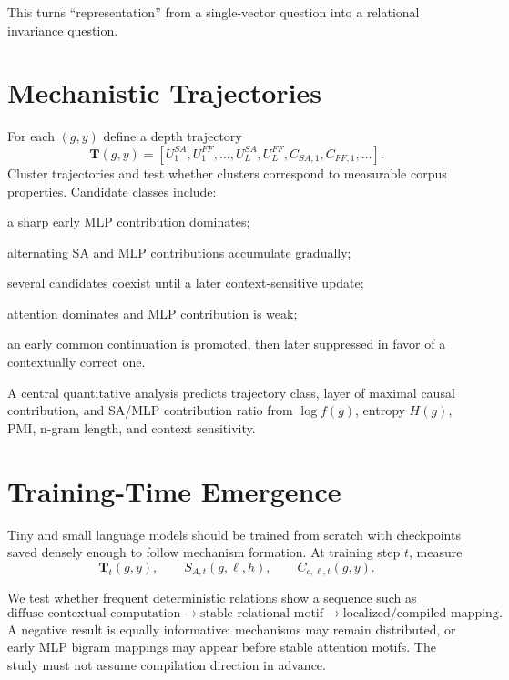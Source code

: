 \documentclass[10pt]{article}
\begin{document}
This turns ``representation'' from a single-vector question into a relational invariance question.

\section{Mechanistic Trajectories}
For each $(g,y)$ define a depth trajectory
\begin{equation}
 \mathbf T(g,y)=\left[U^{SA}_1,U^{FF}_1,\ldots,U^{SA}_L,U^{FF}_L, C_{SA,1},C_{FF,1},\ldots\right].
\end{equation}
Cluster trajectories and test whether clusters correspond to measurable corpus properties. Candidate classes include:
\begin{description}[style=nextline]
    \item[Early lookup:] a sharp early MLP contribution dominates;
    \item[Progressive composition:] alternating SA and MLP contributions accumulate gradually;
    \item[Late disambiguation:] several candidates coexist until a later context-sensitive update;
    \item[Retrieval/copy:] attention dominates and MLP contribution is weak;
    \item[Override/repair:] an early common continuation is promoted, then later suppressed in favor of a contextually correct one.
\end{description}

A central quantitative analysis predicts trajectory class, layer of maximal causal contribution, and SA/MLP contribution ratio from $\log f(g)$, entropy $H(g)$, PMI, n-gram length, and context sensitivity.

\section{Training-Time Emergence}
Tiny and small language models should be trained from scratch with checkpoints saved densely enough to follow mechanism formation. At training step $t$, measure
\begin{equation}
 \mathbf T_t(g,y),\qquad S_{A,t}(g,\ell,h),\qquad C_{c,\ell,t}(g,y).
\end{equation}

We test whether frequent deterministic relations show a sequence such as
\begin{equation}
 \text{diffuse contextual computation}\rightarrow
 \text{stable relational motif}\rightarrow
 \text{localized/compiled mapping}.
\end{equation}
A negative result is equally informative: mechanisms may remain distributed, or early MLP bigram mappings may appear before stable attention motifs. The study must not assume compilation direction in advance.
\end{document}
